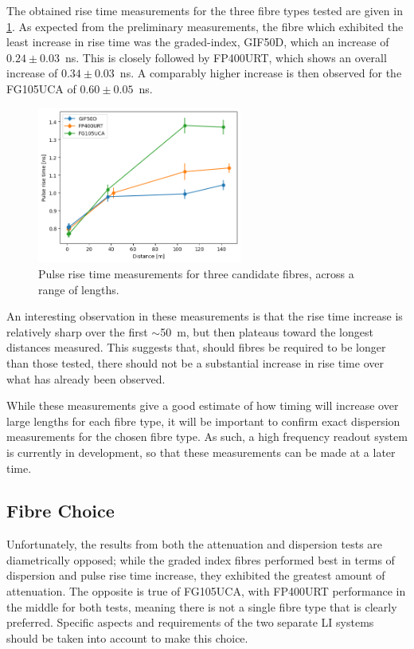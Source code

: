 \documentclass[a4paper,11pt]{article}
\let\oldsim\sim
\renewcommand{\sim}{{\oldsim}}
\begin{document}
The obtained rise time measurements for the three fibre types tested are given in \cref{fig:disprise}. As expected from the preliminary measurements, the fibre which exhibited the least increase in rise time was the graded-index, GIF50D, which an increase of $0.24\pm0.03$~ns. This is closely followed by FP400URT, which shows an overall increase of $0.34\pm0.03$~ns. A comparably higher increase is then observed for the FG105UCA of $0.60\pm0.05$~ns.
\begin{figure}[h]
\centering
\includegraphics[width=0.6\textwidth]{RiseTimeOct24.png}
\caption{Pulse rise time measurements for three candidate fibres, across a range of lengths.}\label{fig:disprise}
\end{figure}
An interesting observation in these measurements is that the rise time increase is relatively sharp over the first $\sim$50~m, but then plateaus toward the longest distances measured. This suggests that, should fibres be required to be longer than those tested, there should not be a substantial increase in rise time over what has already been observed.

While these measurements give a good estimate of how timing will increase over large lengths for each fibre type, it will be important to confirm exact dispersion measurements for the chosen fibre type. As such, a high frequency readout system is currently in development, so that these measurements can be made at a later time.

\subsection{Fibre Choice}\label{sec:fibre:sub:choice}

Unfortunately, the results from both the attenuation and dispersion tests are diametrically opposed; while the graded index fibres performed best in terms of dispersion and pulse rise time increase, they exhibited the greatest amount of attenuation. The opposite is true of FG105UCA, with FP400URT performance in the middle for both tests, meaning there is not a single fibre type that is clearly preferred. Specific aspects and requirements of the two separate LI systems should be taken into account to make this choice.
\end{document}
